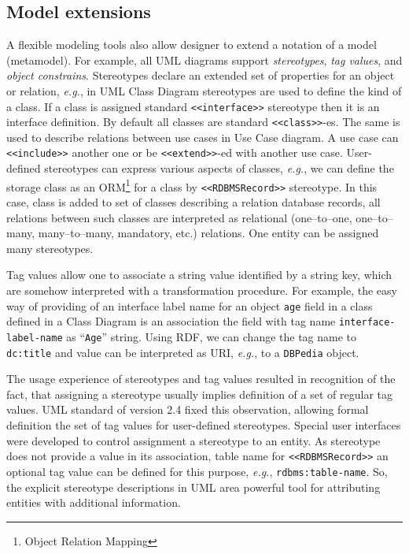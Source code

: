 \documentclass[conference]{IEEEtran}
\begin{document}

\subsection{Model extensions}
\label{sec:mod-ext}

A flexible modeling tools also allow designer to extend a notation of a model (metamodel).  For example, all UML diagrams support \emph{stereotypes}, \emph{tag values}, and \emph{object constrains}.  Stereotypes declare an extended set of properties for an object or relation, \emph{e.g.}, in UML Class Diagram stereotypes are used to define the kind of a class.  If a class is assigned standard \texttt{<<interface>>} stereotype then it is an interface definition.  By default all classes are standard \texttt{<<class>>}-es.  The same is used to describe relations between use cases in Use Case diagram.  A use case can \texttt{<<include>>} another one or be \texttt{<<extend>>}-ed with another use case.  User-defined stereotypes can express various aspects of classes, \emph{e.g.}, we can define the storage class as an ORM\footnote{Object Relation Mapping} for a class by \texttt{<<RDBMSRecord>>} stereotype.  In this case, class is added to set of classes describing a relation database records, all relations between such classes are interpreted as relational (one--to--one, one--to--many, many--to--many, mandatory, etc.) relations.  One entity can be assigned many stereotypes.

Tag values allow one to associate a string value identified by a string key, which are somehow interpreted with a transformation procedure.  For example, the easy way of providing of an interface label name for an object \texttt{age} field in a class defined in a Class Diagram is an association the field with tag name \texttt{interface-label-name} as ``\texttt{Age}'' string.  Using RDF, we can change the tag name to \texttt{dc:title} and value can be interpreted as URI, \emph{e.g.}, to a \texttt{DBPedia} object.

The usage experience of stereotypes and tag values resulted in recognition of the fact, that assigning a stereotype usually implies definition of a set of regular tag values.  UML standard of version 2.4 fixed this observation, allowing formal definition the set of tag values for user-defined stereotypes.  Special user interfaces were developed to control assignment a stereotype to an entity.  As stereotype does not provide a value in its association, table name for \texttt{<<RDBMSRecord>>} an optional tag value can be defined for this purpose, \emph{e.g.}, \texttt{rdbms:table-name}.  So, the explicit stereotype descriptions in UML area powerful tool for attributing entities with additional information.
\end{document}

